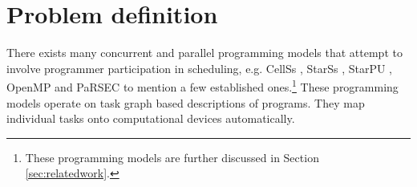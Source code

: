 \documentclass[preprint,10pt,numbers]{sigplanconf}
\begin{document}



  \section{Problem definition}\label{sec:problemdefinition}
There exists many concurrent and parallel programming models that attempt to involve programmer participation in scheduling, e.g. CellSs \cite{Bellens2009}, StarSs \cite{Planas2009}, StarPU \cite{Augonnet2011}, OpenMP \cite{Openmp2013} and PaRSEC \cite{Bosilca2013} to mention a few established ones.\footnote{These programming models are further discussed in Section \ref{sec:relatedwork}.}
These programming models operate on task graph based descriptions of programs. They map individual tasks onto computational devices automatically.
\end{document}
